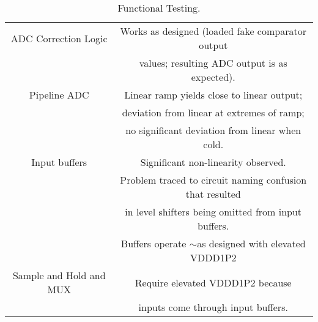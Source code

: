 \begin{table}[h]
\begin{tabular}{|c|c|}
 ADC Correction Logic & Works as designed (loaded fake comparator output \\ 
  & values; resulting ADC output is as expected). \\ \hline
Pipeline ADC & Linear ramp yields close to linear output; \\ 
 & deviation from linear at extremes of ramp; \\ 
  & no significant deviation from linear when cold. \\ \hline
Input buffers & Significant non-linearity observed. \\ 
 & Problem traced to circuit naming confusion that resulted \\ 
 & in level shifters being omitted from input buffers. \\
 & Buffers operate $\sim$as designed with elevated VDDD1P2 \\ \hline
 Sample and Hold and MUX & Require elevated VDDD1P2 because \\ 
 & inputs come through input buffers. \\ \hline
\end{tabular}
\caption{Functional Testing.}
\label{tab:Functionality}
\end{table}